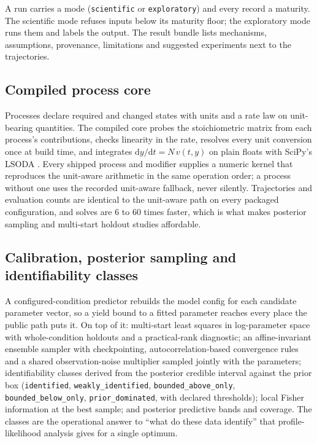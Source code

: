 \documentclass[11pt,a4paper]{article}
\begin{document}
A run carries a mode (\texttt{scientific} or \texttt{exploratory}) and
every record a maturity. The scientific mode refuses inputs below its
maturity floor; the exploratory mode runs them and labels the output. The
result bundle lists mechanisms, assumptions, provenance, limitations and
suggested experiments next to the trajectories.

\subsection{Compiled process core}

Processes declare required and changed states with units and a rate law on
unit-bearing quantities. The compiled core probes the stoichiometric matrix
from each process's contributions, checks linearity in the rate, resolves
every unit conversion once at build time, and integrates
$\mathrm{d}y/\mathrm{d}t = N\,v(t, y)$ on plain floats with SciPy's LSODA
\citep{virtanen2020}. Every shipped process and modifier supplies a numeric
kernel that reproduces the unit-aware arithmetic in the same operation
order; a process without one uses the recorded unit-aware fallback, never
silently. Trajectories and evaluation counts are identical to the
unit-aware path on every packaged configuration, and solves are 6 to 60
times faster, which is what makes posterior sampling and multi-start
holdout studies affordable.

\subsection{Calibration, posterior sampling and identifiability classes}

A configured-condition predictor rebuilds the model config for each
candidate parameter vector, so a yield bound to a fitted parameter reaches
every place the public path puts it. On top of it: multi-start least
squares in log-parameter space with whole-condition holdouts and a
practical-rank diagnostic; an affine-invariant ensemble sampler
\citep{goodman2010} with checkpointing, autocorrelation-based convergence
rules and a shared observation-noise multiplier sampled jointly with the
parameters; identifiability classes derived from the posterior credible
interval against the prior box (\texttt{identified},
\texttt{weakly\_identified}, \texttt{bounded\_above\_only},
\texttt{bounded\_below\_only}, \texttt{prior\_dominated}, with declared
thresholds); local Fisher information at the best sample; and posterior
predictive bands and coverage. The classes are the operational answer to
``what do these data identify'' that profile-likelihood analysis
\citep{raue2009} gives for a single optimum.
\end{document}
